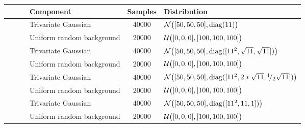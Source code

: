 \small
{}
\renewcommand{\arraystretch}{1.2}
\begin{tabular}{@{}cclSl@{}}
\toprule
				&~						& Component					& {Samples} 	& Distribution\\
\midrule
\ferdosiOne 	&\legendComponentOne	& Trivariate Gaussian 		& 40000		& $\mathcal{N}\big([50, 50, 50], \operatorname{diag}(11)\big)$\\
~ 				&\legendComponentNoise	& Uniform random background	& 20000		& $\mathcal{U}\big([0, 0, 0], [100, 100, 100]\big)$\\
\hline
\baakmanOne		&\legendComponentOne	& Trivariate Gaussian 		& 40000		& $\mathcal{N}\big([50, 50, 50], \operatorname{diag}([11^2, \sqrt{11}, \sqrt{11}])\big)$\\
~ 				&\legendComponentNoise	& Uniform random background	& 20000		& $\mathcal{U}\big([0, 0, 0], [100, 100, 100]\big)$\\
\hline
\baakmanFour	&\legendComponentOne	& Trivariate Gaussian 		& 40000		& $\mathcal{N}\big([50, 50, 50], \operatorname{diag}([11^2, 2 * \sqrt{11}, {}^{1}\!/_{2} \sqrt{11}])\big)$\\
~ 				&\legendComponentNoise	& Uniform random background	& 20000		& $\mathcal{U}\big([0, 0, 0], [100, 100, 100]\big)$\\
\hline
\baakmanFive	&\legendComponentOne	& Trivariate Gaussian 		& 40000		& $\mathcal{N}\big([50, 50, 50], \operatorname{diag}([11^2, 11, 1])\big)$\\
~ 				&\legendComponentNoise	& Uniform random background	& 20000		& $\mathcal{U}\big([0, 0, 0], [100, 100, 100]\big)$\\
\bottomrule
\end{tabular}